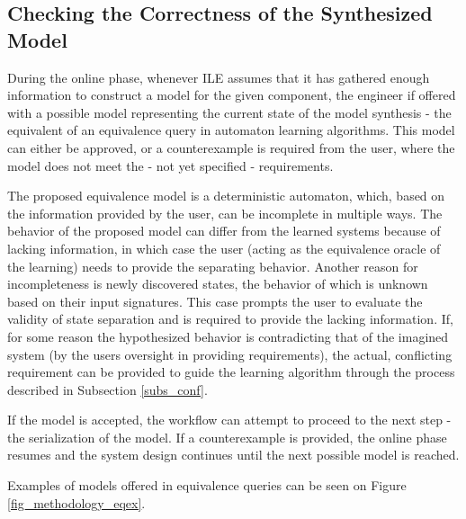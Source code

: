 \subsection{Checking the Correctness of the Synthesized Model} \label{subs_eq}
During the online phase, whenever ILE assumes that it has gathered enough information to construct a model for the given component, the engineer if offered with a possible model representing the current state of the model synthesis - the equivalent of an equivalence query in automaton learning algorithms. This model can either be approved, or a counterexample is required from the user, where the model does not meet the - not yet specified - requirements.

The proposed equivalence model is a deterministic automaton, which, based on the information provided by the user, can be incomplete in multiple ways. The behavior of the proposed model can differ from the learned systems because of lacking information, in which case the user (acting as the equivalence oracle of the learning) needs to provide the separating behavior. Another reason for incompleteness is newly discovered states, the behavior of which is unknown based on their input signatures. This case prompts the user to evaluate the validity of state separation and is required to provide the lacking information. If, for some reason the hypothesized behavior is contradicting that of the imagined system (by the users oversight in providing requirements), the actual, conflicting requirement can be provided to guide the learning algorithm through the process described in Subsection \ref{subs_conf}.

If the model is accepted, the workflow can attempt to proceed to the next step - the serialization of the model. If a counterexample is provided, the online phase resumes and the system design continues until the next possible model is reached.

Examples of models offered in equivalence queries can be seen on Figure \ref{fig_methodology_eqex}.

